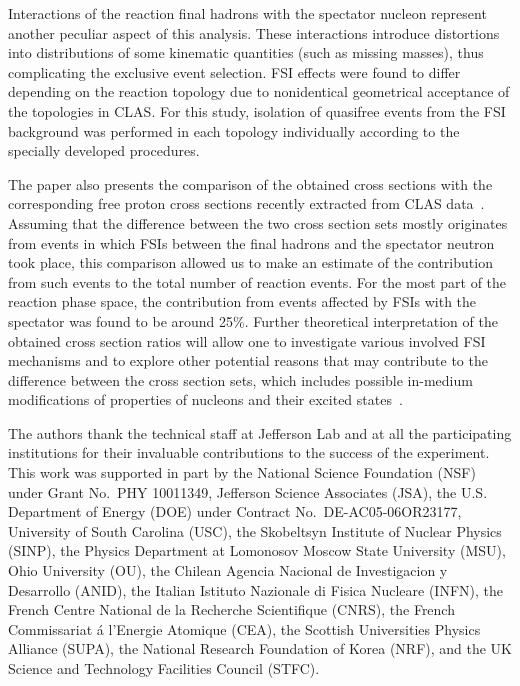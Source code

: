 \documentclass[prc,twocolumn,superscriptaddress,showpacs,amssymb,amsmath,amsfonts,aps,nofootinbib]{revtex4-1}
\begin{document}
Interactions of the reaction final hadrons with the spectator nucleon represent another peculiar aspect of this analysis. These interactions introduce distortions into distributions of some kinematic quantities (such as missing masses), thus complicating the exclusive event selection. FSI effects were found to differ depending on the reaction topology due to nonidentical geometrical acceptance of the topologies in CLAS. For this study, isolation of quasifree events from the FSI background was performed in each topology individually according to the specially developed procedures.

The paper also presents the comparison of the obtained cross sections with the corresponding free proton cross sections recently extracted from CLAS data~\cite{Fed_an_note:2017,Fed_paper_2018}. Assuming that the difference between the two cross section sets mostly originates from events in which FSIs between the final hadrons and the spectator neutron took place, this comparison allowed us to make an estimate of the contribution from such events to the total number of reaction events. For the most part of the reaction phase space, the contribution from events affected by FSIs with the spectator was found to be around 25\%. Further theoretical interpretation of the obtained cross section ratios will allow one to investigate various involved FSI mechanisms and to explore other potential reasons that may contribute to the difference between the cross section sets, which includes possible in-medium modifications of properties of nucleons and their excited states~\cite{Mokeev:1995fy,Bianchi:1994ax,Ahrens:1986hn,Krusche:2004xz,Noble:1980my}.


\vspace{2em}

\begin{acknowledgments}
The authors thank the technical staff at Jefferson Lab and at all the participating institutions for their invaluable contributions to the success of the experiment.
This work was supported in part by the National Science Foundation (NSF) under Grant No.~PHY 10011349, Jefferson Science Associates (JSA), the U.S. Department of Energy (DOE) under Contract No.~DE-AC05-06OR23177, University of South Carolina (USC), the Skobeltsyn Institute of Nuclear Physics (SINP), the Physics Department at Lomonosov Moscow State University (MSU), Ohio University (OU), the Chilean Agencia Nacional de Investigacion y Desarrollo (ANID), the Italian Istituto Nazionale di Fisica Nucleare (INFN), the French Centre National de la Recherche Scientifique (CNRS), the French Commissariat \'a l'Energie Atomique (CEA), the Scottish Universities Physics Alliance (SUPA), the National Research Foundation of Korea (NRF), and the UK Science and Technology Facilities Council (STFC). 
\end{acknowledgments}


{}

\end{document}

